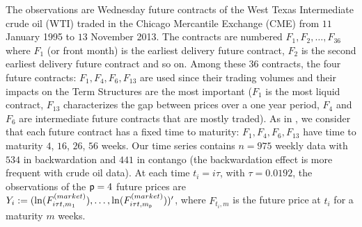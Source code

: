 The observations are Wednesday future contracts of the West Texas Intermediate crude oil (WTI) traded in the Chicago Mercantile Exchange (CME) from $11$ January 1995 to $13$ November 2013. The contracts are numbered $F_1, F_2, \ldots, F_{36}$ where $F_1$ (or front month) is the earliest delivery future contract, $F_2$ is the second earliest delivery future contract and so on. Among these $36$ contracts, the four future contracts: $F_1, F_4, F_6, F_{13}$ are used since their trading volumes and their impacts on the Term Structures are the most important ($F_1$ is the most liquid contract, $F_{13}$ characterizes the gap between prices over a one year period, $F_4$ and $F_6$ are intermediate future contracts that are mostly traded). As in \cite{almansour:2016}, we consider that each  future contract has a fixed time to maturity: $F_1, F_4, F_6, F_{13}$ have time to  maturity $4$, $16$, $26$, $56$ weeks.  Our time series contains $n =975$ weekly data with $534$ in backwardation and $441$ in contango (the backwardation effect is more frequent with crude oil data). At each time $t_i = i\tau$, with $\tau = 0.0192$, the observations of the $\mathsf{p} = 4$ future prices are $Y_i := (\ln(F^{(market)}_{i\tau t,m_1}), \ldots, \ln(F^{(market)}_{i\tau t,m_{\mathsf{p}}}))'$, where $F_{t_i,m}$ is the future price at $t_i$ for a maturity  $m$ weeks.
